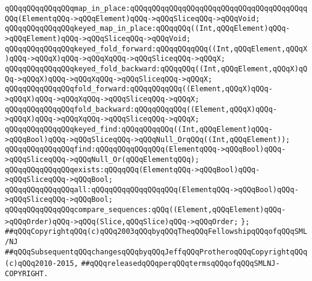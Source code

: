 \newline
\verb|qQQqqQQqqQQqqQQqmap_in_place:qQQqqQQqqQQqqQQqqQQqqQQqqQQqqQQqqQQqqQQqqQQq(ElementqQQq->qQQqElement)qQQq->qQQqSliceqQQq->qQQqVoid;|\newline
\verb|qQQqqQQqqQQqqQQqkeyed_map_in_place:qQQqqQQq((Int,qQQqElement)qQQq->qQQqElement)qQQq->qQQqSliceqQQq->qQQqVoid;|\newline
\newline
\verb|qQQqqQQqqQQqqQQqkeyed_fold_forward:qQQqqQQqqQQq((Int,qQQqElement,qQQqX)qQQq->qQQqX)qQQq->qQQqXqQQq->qQQqSliceqQQq->qQQqX;|\newline
\verb|qQQqqQQqqQQqqQQqkeyed_fold_backward:qQQqqQQq((Int,qQQqElement,qQQqX)qQQq->qQQqX)qQQq->qQQqXqQQq->qQQqSliceqQQq->qQQqX;|\newline
\newline
\verb|qQQqqQQqqQQqqQQqfold_forward:qQQqqQQqqQQq((Element,qQQqX)qQQq->qQQqX)qQQq->qQQqXqQQq->qQQqSliceqQQq->qQQqX;|\newline
\verb|qQQqqQQqqQQqqQQqfold_backward:qQQqqQQqqQQq((Element,qQQqX)qQQq->qQQqX)qQQq->qQQqXqQQq->qQQqSliceqQQq->qQQqX;|\newline
\newline
\verb|qQQqqQQqqQQqqQQqkeyed_find:qQQqqQQqqQQq((Int,qQQqElement)qQQq->qQQqBool)qQQq->qQQqSliceqQQq->qQQqNull_OrqQQq((Int,qQQqElement));|\newline
\verb|qQQqqQQqqQQqqQQqfind:qQQqqQQqqQQqqQQq(ElementqQQq->qQQqBool)qQQq->qQQqSliceqQQq->qQQqNull_Or(qQQqElementqQQq);|\newline
\newline
\verb|qQQqqQQqqQQqqQQqexists:qQQqqQQq(ElementqQQq->qQQqBool)qQQq->qQQqSliceqQQq->qQQqBool;|\newline
\verb|qQQqqQQqqQQqqQQqall:qQQqqQQqqQQqqQQqqQQq(ElementqQQq->qQQqBool)qQQq->qQQqSliceqQQq->qQQqBool;|\newline
\newline
\verb|qQQqqQQqqQQqqQQqcompare_sequences:qQQq((Element,qQQqElement)qQQq->qQQqOrder)qQQq->qQQq(Slice,qQQqSlice)qQQq->qQQqOrder;|\newline
\newline
\verb|};|\newline
\newline
\newline
\verb|##qQQqCopyrightqQQq(c)qQQq2003qQQqbyqQQqTheqQQqFellowshipqQQqofqQQqSML/NJ|\newline
\verb|##qQQqSubsequentqQQqchangesqQQqbyqQQqJeffqQQqProtheroqQQqCopyrightqQQq(c)qQQq2010-2015,|\newline
\verb|##qQQqreleasedqQQqperqQQqtermsqQQqofqQQqSMLNJ-COPYRIGHT.|\newline

